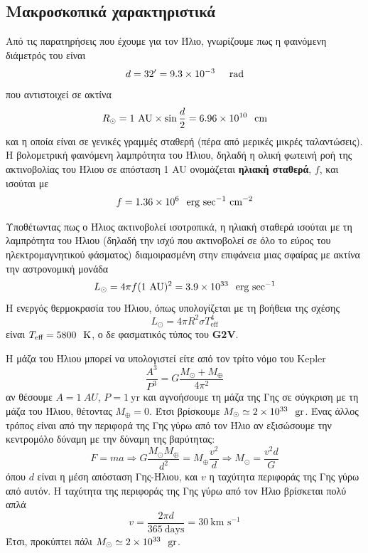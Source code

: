 \subsection{Μακροσκοπικά χαρακτηριστικά}
Από τις παρατηρήσεις που έχουμε για τον Ήλιο, γνωρίζουμε πως η φαινόμενη διάμετρός του είναι
$$d = 32^\prime = 9.3 \times 10^{-3} \hspace{0.5cm} \text{rad}$$ που αντιστοιχεί σε ακτίνα
$$R_{\odot} = 1 \ \text{AU} \times \sin{\frac{d}{2}} = 6.96 \times 10^{10} \hspace{0.25cm} \text{cm}$$ και η οποία είναι σε γενικές γραμμές σταθερή (πέρα από μερικές μικρές ταλαντώσεις). Η βολομετρική φαινόμενη λαμπρότητα του Ήλιου, δηλαδή η ολική φωτεινή ροή της ακτινοβολίας του Ήλιου σε απόσταση 1 AU ονομάζεται \textbf{ηλιακή σταθερά}, $f$, και ισούται με 
$$f=1.36 \times 10^6 \hspace{0.25cm} \text{erg sec$^{-1}$ cm$^{-2}$}$$

Υποθέτωντας πως ο Ήλιος ακτινοβολεί ισοτροπικά, η ηλιακή σταθερά ισούται με τη λαμπρότητα του Ήλιου (δηλαδή την ισχύ που ακτινοβολεί σε όλο το εύρος του ηλεκτρομαγνητικού φάσματος) διαμοιρασμένη στην επιφάνεια μιας σφαίρας με ακτίνα την αστρονομική μονάδα
$$L_{\odot} = 4\pi f (1 \ \text{AU})^2 = 3.9 \times 10^{33} \hspace{0.25cm} \text{erg sec$^{-1}$}$$
Η ενεργός θερμοκρασία του Ήλιου, όπως υπολογίζεται με τη βοήθεια της σχέσης
$$L_{\odot} = 4\pi R^2 \sigma T_{\text{eff}}^4$$ 
είναι $T_{\text{eff}} = 5800 \hspace{0.25cm} \text{K}$, ο δε φασματικός τύπος του \textbf{G2V}.

Η μάζα του Ήλιου μπορεί να υπολογιστεί είτε από τον τρίτο νόμο του Kepler 
$$\frac{A^3}{P^3} = G \frac{M_{\odot} + M_{\oplus}}{4 \pi ^2}$$ αν θέσουμε $A = 1 \ AU$, $P = 1 \ \text{yr}$ και αγνοήσουμε τη μάζα της Γης σε σύγκριση με τη μάζα του Ήλιου, θέτοντας $M_{\oplus} = 0$. Έτσι βρίσκουμε $M_{\odot} \simeq 2 \times 10^{33} \hspace{0.25cm} \text{gr}$. Ένας άλλος τρόπος είναι από την περιφορά της Γης γύρω από τον Ήλιο αν εξισώσουμε την κεντρομόλο δύναμη με την δύναμη της βαρύτητας:
$$F = ma \Rightarrow G \frac{M_\odot M_\oplus}{d^2} = M_\oplus \frac{v^2}{d} \Rightarrow M_{\odot} = \frac{v^2 d}{G}$$ όπου $d$ είναι η μέση απόσταση Γης-Ήλιου, και $v$ η ταχύτητα περιφοράς της Γης γύρω από αυτόν. Η ταχύτητα της περιφοράς της Γης γύρω από τον Ήλιο βρίσκεται πολύ απλά
$$v = \frac{2\pi d}{365 \ \text{days}} = 30 \ \text{km s$^{-1}$}$$
Έτσι, προκύπτει πάλι $M_{\odot} \simeq 2 \times 10^{33} \hspace{0.25cm} \text{gr}$.

